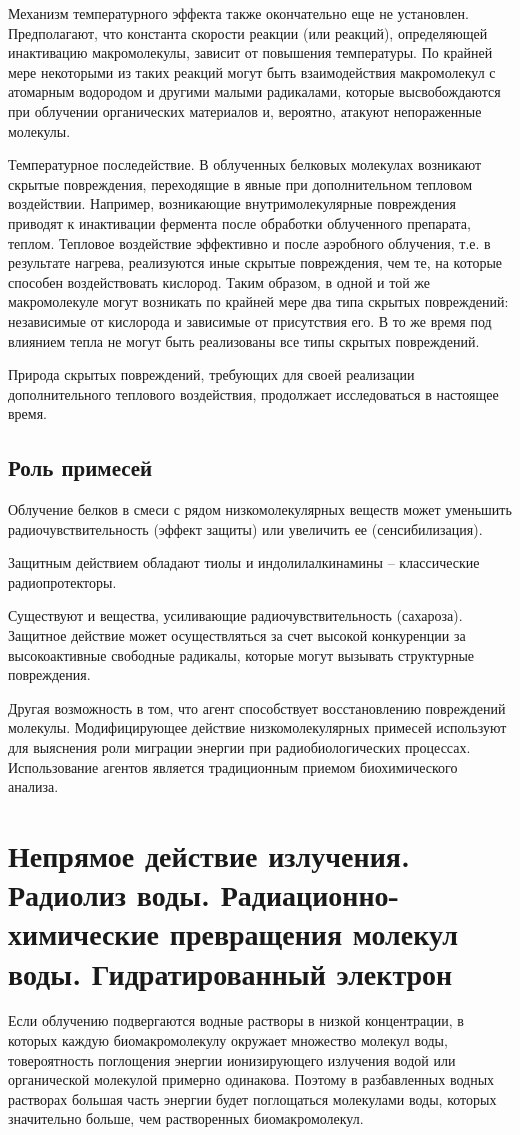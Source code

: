 \documentclass[a4paper, 14pt]{article}
\begin{document}
Механизм температурного эффекта также окончательно еще не установлен. Предполагают, что константа скорости реакции (или реакций), определяющей инактивацию макромолекулы, зависит от повышения температуры. По крайней мере некоторыми из таких реакций могут быть взаимодействия макромолекул с атомарным водородом и другими малыми радикалами, которые высвобождаются при облучении органических материалов и, вероятно, атакуют непораженные молекулы. 

Температурное последействие. В облученных белковых молекулах возникают скрытые повреждения, переходящие в явные при дополнительном тепловом воздействии. Например, возникающие внутримолекулярные повреждения приводят к инактивации фермента после обработки облученного препарата, теплом. Тепловое воздействие эффективно и после аэробного облучения, т.е. в результате нагрева, реализуются иные скрытые повреждения, чем те, на которые способен воздействовать
кислород. Таким образом, в одной и той же макромолекуле могут возникать по
крайней мере два типа скрытых повреждений: независимые от кислорода и зависимые
от присутствия его. В то же время под влиянием тепла не могут быть реализованы все
типы скрытых повреждений.

Природа скрытых повреждений, требующих для своей реализации
дополнительного теплового воздействия, продолжает исследоваться в настоящее
время.

\subsection{Роль примесей}
Облучение белков в смеси с рядом низкомолекулярных веществ может
уменьшить радиочувствительность (эффект защиты) или увеличить ее
(сенсибилизация).

Защитным действием обладают тиолы и индолилалкинамины – классические
радиопротекторы.

Существуют и вещества, усиливающие радиочувствительность (сахароза).
Защитное действие может осуществляться за счет высокой конкуренции за
высокоактивные свободные радикалы, которые могут вызывать структурные
повреждения.

Другая возможность в том, что агент способствует восстановлению
повреждений молекулы. Модифицирующее действие низкомолекулярных примесей
используют для выяснения роли миграции энергии при радиобиологических
процессах. Использование агентов является традиционным приемом биохимического
анализа.

\section{Непрямое действие излучения. Радиолиз воды. Радиационно-химические
превращения молекул воды. Гидратированный электрон}
Если облучению подвергаются водные растворы в низкой концентрации, в
которых каждую биомакромолекулу окружает множество молекул воды, товероятность поглощения энергии ионизирующего излучения водой или органической
молекулой примерно одинакова. Поэтому в разбавленных водных растворах большая
часть энергии будет поглощаться молекулами воды, которых значительно больше, чем
растворенных биомакромолекул.
\end{document}
